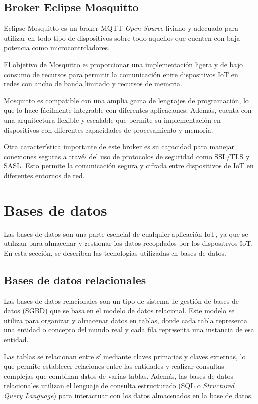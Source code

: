 \subsection{Broker Eclipse Mosquitto}
\label{subsec:mosquitto}

Eclipse Mosquitto \citep{WEBSITE:MOSQUITTO} es un broker MQTT \textit{Open Source} liviano y adecuado para utilizar en todo tipo de dispositivos sobre todo aquellos que cuenten con baja potencia como microcontroladores.

El objetivo de Mosquitto es proporcionar una implementación ligera y de bajo consumo de recursos para permitir la comunicación entre dispositivos IoT en redes con ancho de banda limitado y recursos de memoria.

Mosquitto es compatible con una amplia gama de lenguajes de programación, lo que lo hace fácilmente integrable con diferentes aplicaciones. Además, cuenta con una arquitectura flexible y escalable que permite su implementación en dispositivos con diferentes capacidades de procesamiento y memoria.

Otra característica importante de este broker es su capacidad para manejar conexiones seguras a través del uso de protocolos de seguridad como SSL/TLS y SASL. Esto permite la comunicación segura y cifrada entre dispositivos de IoT en diferentes entornos de red.	

\section{Bases de datos}
\label{sec:ddbb}

Las bases de datos son una parte esencial de cualquier aplicación IoT, ya que se utilizan para almacenar y gestionar los datos recopilados por los dispositivos IoT. En esta sección, se describen las tecnologías utilizadas en bases de datos.

\subsection{Bases de datos relacionales}
\label{subsec:RDBMS}

Las bases de datos relacionales \cite{CJ-Date} son un tipo de sistema de gestión de bases de datos (SGBD) que se basa en el modelo de datos relacional. Este modelo se utiliza para organizar y almacenar datos en tablas, donde cada tabla representa una entidad o concepto del mundo real y cada fila representa una instancia de esa entidad.

Las tablas se relacionan entre sí mediante claves primarias y claves externas, lo que permite establecer relaciones entre las entidades y realizar consultas complejas que combinan datos de varias tablas. Además, las bases de datos relacionales utilizan el lenguaje de consulta estructurado (SQL o \textit{Structured Query Language}) para interactuar con los datos almacenados en la base de datos.

